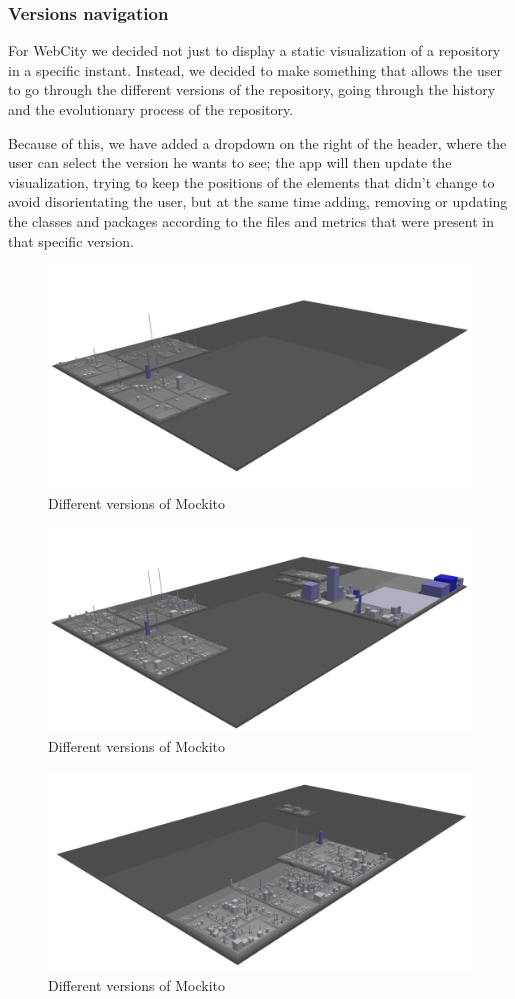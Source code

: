 \documentclass[]{usiinfbachelorproject}
\begin{document}
\subsubsection{Versions navigation} \label{Version navigation}
For WebCity we decided not just to display a static visualization of a repository in a specific instant. Instead, we
decided to make something that allows the user to go through the different versions of the repository, going through the history and the evolutionary process of the repository.

 Because of this, we have added a dropdown on the right of the header, where the user can select the version he wants to see; the app will then update the visualization, trying to keep the positions of the elements that didn't change to avoid disorientating the user, but at the same time adding, removing or updating the classes and packages according to the files and metrics that were present in that specific version.

 \begin{figure} [H]
 \centering
 \includegraphics[width=.6\textwidth]{pictures/version1.png}
 \caption{Different versions of Mockito}
 \label{fig:version1}
 \end{figure}

 \begin{figure} [H]
 \centering
 \includegraphics[width=.6\textwidth]{pictures/version2.png}
 \caption{Different versions of Mockito}
 \label{fig:version2}
 \end{figure}

 \begin{figure} [H]
 \centering
 \includegraphics[width=.6\textwidth]{pictures/version3.png}
 \caption{Different versions of Mockito}
 \label{fig:version3}
 \end{figure}
\end{document}
